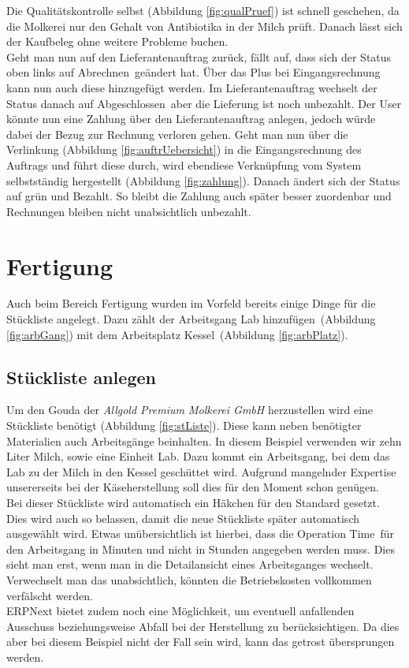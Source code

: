 Die Qualitätskontrolle selbst (\vgl Abbildung \ref{fig:qualPruef}) ist schnell geschehen, da die Molkerei nur den Gehalt von Antibiotika in der Milch prüft. Danach lässt sich der Kaufbeleg ohne weitere Probleme buchen. \\
Geht man nun auf den Lieferantenauftrag zurück, fällt auf, dass sich der Status oben links auf \glqq Abrechnen\grqq\ geändert hat. Über das Plus bei Eingangsrechnung kann nun auch diese hinzugefügt werden. Im Lieferantenauftrag wechselt der Status danach auf \glqq Abgeschlossen\grqq\, aber die Lieferung ist noch unbezahlt. Der User könnte nun eine Zahlung über den Lieferantenauftrag anlegen, jedoch würde dabei der Bezug zur Rechnung verloren gehen. Geht man nun über die Verlinkung (\vgl Abbildung \ref{fig:auftrUebersicht}) in die Eingangsrechnung des Auftrags und führt diese durch, wird ebendiese Verknüpfung vom System selbstständig hergestellt (\vgl Abbildung \ref{fig:zahlung}). Danach ändert sich der Status auf grün und \glqq Bezahlt\grqq. So bleibt die Zahlung auch später besser zuordenbar und Rechnungen bleiben nicht unabsichtlich unbezahlt.

\section{Fertigung}
Auch beim Bereich Fertigung wurden im Vorfeld bereits einige Dinge für die Stückliste angelegt. Dazu zählt der Arbeitsgang \glqq Lab hinzufügen\grqq\ (\vgl Abbildung \ref{fig:arbGang}) mit dem Arbeitsplatz \glqq Kessel\grqq\ (\vgl Abbildung \ref{fig:arbPlatz}).

\subsection{Stückliste anlegen}
Um den Gouda der \emph{Allgold Premium Molkerei GmbH} herzustellen wird eine Stückliste benötigt (\vgl Abbildung \ref{fig:stListe}). Diese kann neben benötigter Materialien auch Arbeitsgänge beinhalten. In diesem Beispiel verwenden wir zehn Liter Milch, sowie eine Einheit Lab. Dazu kommt ein Arbeitsgang, bei dem das Lab zu der Milch in den Kessel geschüttet wird. Aufgrund mangelnder Expertise unsererseits bei der Käseherstellung soll dies für den Moment schon genügen. \\
Bei dieser Stückliste wird automatisch ein Häkchen für den Standard gesetzt. Dies wird auch so belassen, damit die neue Stückliste später automatisch ausgewählt wird. 
Etwas unübersichtlich ist hierbei, dass die \glqq Operation Time\grqq\ für den Arbeitsgang in Minuten und nicht in Stunden angegeben werden muss. Dies sieht man erst, wenn man in die Detailansicht eines Arbeitsganges wechselt. Verwechselt man das unabsichtlich, könnten die Betriebskosten vollkommen verfälscht werden. \\
ERPNext bietet zudem noch eine Möglichkeit, um eventuell anfallenden Ausschuss beziehungsweise Abfall bei der Herstellung zu berücksichtigen. Da dies aber bei diesem Beispiel nicht der Fall sein wird, kann das getrost übersprungen werden.


